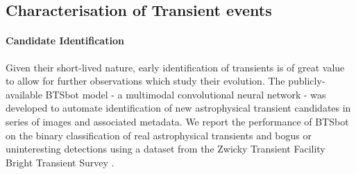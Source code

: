 \documentclass[dvipsnames,table]{article}
\newcommand{\FL}[1]{{\color{magenta}FL: #1}}
\begin{document}



\subsection{Characterisation of Transient events}

\paragraph{Candidate Identification} Given their short-lived nature, early identification of transients is of great value to allow for further observations which study their evolution. The publicly-available BTSbot model \cite{BTSbot_2023, BTSbot_2024} - a multimodal convolutional neural network - was developed to automate identification of new astrophysical transient candidates in series of images and associated metadata. We report the performance of BTSbot on the binary classification of real astrophysical transients and bogus or uninteresting detections using a dataset from the Zwicky Transient Facility \citep[ZTF;][]{Bellm19a, Bellm19b} Bright Transient Survey \citep[BTS;][]{Fremling20, Perley20}.
\end{document}

